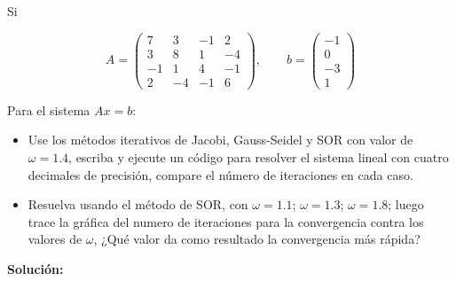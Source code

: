 Si 

\begin{equation}
    A = 
    \begin{pmatrix}
     7 &  3 & -1 &  2 \\ 
     3 &  8 &  1 & -4 \\
    -1 &  1 &  4 & -1 \\
     2 & -4 & -1 &  6
    \end{pmatrix}
    , \quad \quad
    b = 
    \begin{pmatrix}
    -1 \\ 
     0 \\
    -3 \\
     1
    \end{pmatrix}
\end{equation}

Para  el  sistema  $Ax=b$:

\begin{itemize}
    \item Use los  métodos  iterativos  de  Jacobi,  Gauss-Seidel y  SOR  con  valor  de $\omega=1.4$, escriba  y  ejecute  un  código para  resolver  el  sistema  lineal con  cuatro  decimales  de  precisión,  compare  el  número de  iteraciones  en  cada  caso.
    \item Resuelva  usando  el  método  de  SOR,  con $\omega=1.1$;  $\omega=1.3$;  $\omega=1.8$;  luego  trace  la  gráfica  del  numero  de  iteraciones  para  la  convergencia  contra  los  valores de $\omega$, ¿Qué valor  da  como  resultado la  convergencia  más rápida?
\end{itemize}

\textbf{Solución:}

